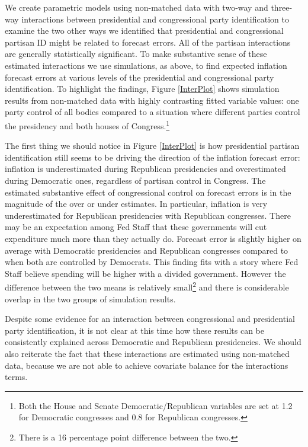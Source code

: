 \documentclass[a4paper]{article}\usepackage{graphicx, color}
\begin{document}
We create parametric models using non-matched data with two-way and three-way interactions between presidential and congressional party identification to examine the two other ways we identified that presidential and congressional partisan ID might be related to forecast errors. All of the partisan interactions are generally statistically significant. To make substantive sense of these estimated interactions we use simulations, as above, to find expected inflation forecast errors at various levels of the presidential and congressional party identification. To highlight the findings, Figure \ref{InterPlot} shows simulation results from non-matched data with highly contrasting fitted variable values: one party control of all bodies compared to a situation where different parties control the presidency and both houses of Congress.\footnote{Both the House and Senate Democratic/Republican variables are set at 1.2 for Democratic congresses and 0.8 for Republican congresses.} 

The first thing we should notice in Figure \ref{InterPlot} is how presidential partisan identification still seems to be driving the direction of the inflation forecast error: inflation is underestimated during Republican presidencies and overestimated during Democratic ones, regardless of partisan control in Congress. The estimated substantive effect of congressional control on forecast errors is in the magnitude of the over or under estimates. In particular, inflation is very underestimated for Republican presidencies with Republican congresses. There may be an expectation among Fed Staff that these governments will cut expenditure much more than they actually do. Forecast error is slightly higher on average with Democratic presidencies and Republican congresses compared to when both are controlled by Democrats. This finding fits with a story where Fed Staff believe spending will be higher with a divided government. However the difference between the two means is relatively small\footnote{There is a 16 percentage point difference between the two.} and there is considerable overlap in the two groups of simulation results.

Despite some evidence for an interaction between congressional and presidential party identification, it is not clear at this time how these results can be consistently explained across Democratic and Republican presidencies. We should also reiterate the fact that these interactions are estimated using non-matched data, because we are not able to achieve covariate balance for the interactions terms.
\end{document}
